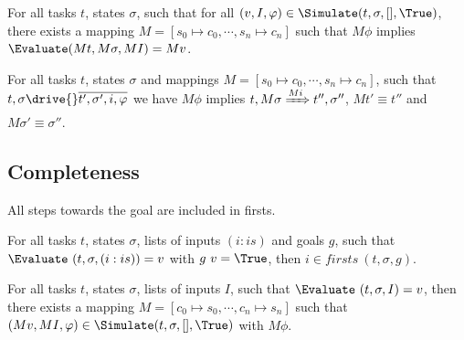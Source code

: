 \begin{lemma}
  \label{lem:soundsimulate}

  For all tasks $t$, states $\sigma$,
  such that for all $(v,I,\phi)\in \Simulate (t,\sigma,[],\True)$,
  there exists a mapping $M = [s_0\mapsto c_0,\cdots,s_n\mapsto c_n]$
  such that $M\phi$ implies $\Evaluate (M t,M \sigma,M I) = M v$.
\end{lemma}

\begin{lemma}
  \label{lem:sounddrive}

  For all tasks $t$, states $\sigma$ and mappings $M=[s_0\mapsto c_0,\cdots,s_n\mapsto c_n]$,
  such that $t,\sigma\drive{} \overline{t',\sigma',i,\phi}$
  we have $M\phi$ implies
  $t,M\sigma \xRightarrow[]{M i} t'',\sigma''$, $Mt' \equiv t''$ and $M\sigma' \equiv \sigma''$.
\end{lemma}

\subsection{Completeness}

All steps towards the goal are included in firsts.

\begin{lemma}
  \label{lem:completefirsts}

  For all tasks $t$, states $\sigma$, lists of inputs $(i:is)$ and goals $g$,
  such that $\Evaluate\ (t,\sigma,(i:is))=v$ with $g\ v =\True$,
  then $i\in firsts\ (t,\sigma,g)$.

\end{lemma}


\begin{lemma}
  \label{lem:completesimulate}
  For all tasks $t$, states $\sigma$, lists of inputs $I$,
  such that $\Evaluate\ (t,\sigma,I)=v$,
  then there exists a mapping $M = [c_0\mapsto s_0,\cdots,c_n\mapsto s_n]$
  such that $(M v,M I,\phi)\in\Simulate(t,\sigma,[],\True)$ with $M \phi$.
\end{lemma}
